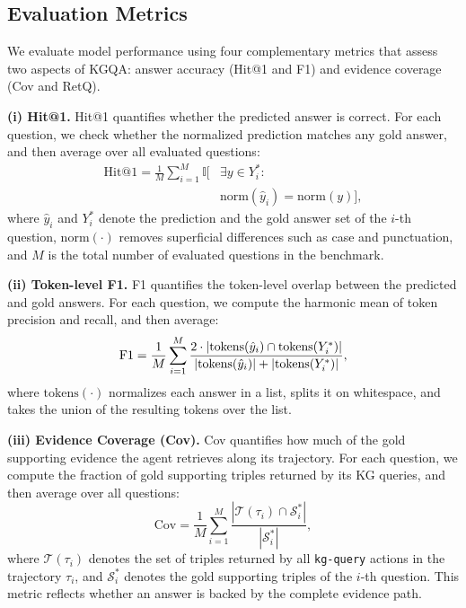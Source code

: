 \subsection{Evaluation Metrics}
\label{app:metrics}
We evaluate model performance using four complementary metrics that assess two aspects of KGQA: answer accuracy (Hit@1 and F1) and evidence coverage (Cov and RetQ).

\textbf{(i) Hit@1.}
Hit@1 quantifies whether the predicted answer is correct. For each question, we check whether the normalized prediction matches any gold answer, and then average over all evaluated questions:
\begin{equation}
\begin{aligned}
    \mathrm{Hit@1} = \frac{1}{M}\sum_{i=1}^{M}
        \mathbb{I}\bigl[&\exists y \in Y_i^{*}: \\
        &\mathrm{norm}(\hat{y}_i) = \mathrm{norm}(y)\bigr],
\end{aligned}
\end{equation}
where $\hat{y}_i$ and $Y_i^{*}$ denote the prediction and the gold answer set of the $i$-th question, $\mathrm{norm}(\cdot)$ removes superficial differences such as case and punctuation, and $M$ is the total number of evaluated questions in the benchmark.

\textbf{(ii) Token-level F1.}
F1 quantifies the token-level overlap between the predicted and gold answers. For each question, we compute the harmonic mean of token precision and recall, and then average:
\begin{equation}
\small
    \mathrm{F1} = \frac{1}{M}\sum_{i=1}^{M}
        \dfrac{2\cdot\left|\mathrm{tokens}(\hat{y}_i) \cap \mathrm{tokens}(Y_i^{*})\right|}
             {\left|\mathrm{tokens}(\hat{y}_i)\right| + \left|\mathrm{tokens}(Y_i^{*})\right|},
\end{equation}
where $\mathrm{tokens}(\cdot)$ normalizes each answer in a list, splits it on whitespace, and takes the union of the resulting tokens over the list.

\textbf{(iii) Evidence Coverage (Cov).}
Cov quantifies how much of the gold supporting evidence the agent retrieves along its trajectory. For each question, we compute the fraction of gold supporting triples returned by its KG queries, and then average over all questions:
\begin{equation}
    \mathrm{Cov} = \frac{1}{M}\sum_{i=1}^{M}
        \frac{|\mathcal{T}(\tau_i) \cap \mathcal{S}^{*}_{i}|}
             {|\mathcal{S}^{*}_{i}|},
\end{equation}
where $\mathcal{T}(\tau_i)$ denotes the set of triples returned by all \texttt{kg-query} actions in the trajectory $\tau_i$, and $\mathcal{S}^{*}_{i}$ denotes the gold supporting triples of the $i$-th question. This metric reflects whether an answer is backed by the complete evidence path.

